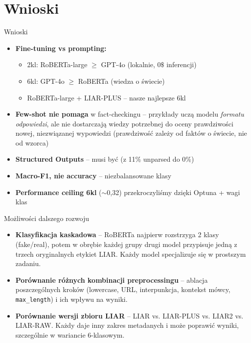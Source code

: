 \documentclass[10pt]{beamer}
\begin{document}
\section{Wnioski}

\begin{frame}{Wnioski}
  \begin{itemize}
    \item \textbf{Fine-tuning vs prompting:}
          \begin{itemize}
            \item 2kl: RoBERTa-large $\geq$ GPT-4o (lokalnie, 0$\$$ inferencji)
            \item 6kl: GPT-4o $\geq$ RoBERTa (wiedza o świecie)
            \item RoBERTa-large + LIAR-PLUS -- nasze najlepsze 6kl
          \end{itemize}
    \item \textbf{Few-shot nie pomaga} w fact-checkingu -- przykłady
          uczą modelu \emph{formatu odpowiedzi}, ale nie dostarczają wiedzy
          potrzebnej do oceny prawdziwości nowej, niezwiązanej wypowiedzi
          (prawdziwość zależy od faktów o świecie, nie od wzorca)
    \item \textbf{Structured Outputs} -- musi być (z 11\% unparsed do 0\%)
    \item \textbf{Macro-F1, nie accuracy} -- niezbalansowane klasy
    \item \textbf{Performance ceiling 6kl} ($\sim$0{,}32) przekroczyliśmy dzięki Optuna + wagi klas
  \end{itemize}
\end{frame}

\begin{frame}{Możliwości dalszego rozwoju}
  \begin{itemize}
    \item \textbf{Klasyfikacja kaskadowa} -- RoBERTa najpierw rozstrzyga 2 klasy
          (fake/real), potem w obrębie każdej grupy drugi model przypisuje
          jedną z trzech oryginalnych etykiet LIAR. Każdy model specjalizuje
          się w prostszym zadaniu.
    \item \textbf{Porównanie różnych kombinacji preprocessingu} -- ablacja
          poszczególnych kroków (lowercase, URL, interpunkcja, kontekst mówcy,
          \texttt{max\_length}) i ich wpływu na wyniki.
    \item \textbf{Porównanie wersji zbioru LIAR} -- LIAR vs. LIAR-PLUS vs.
          LIAR2 vs. LIAR-RAW. Każdy daje inny zakres metadanych i może
          poprawić wyniki, szczególnie w wariancie 6-klasowym.
  \end{itemize}
\end{frame}
\end{document}
